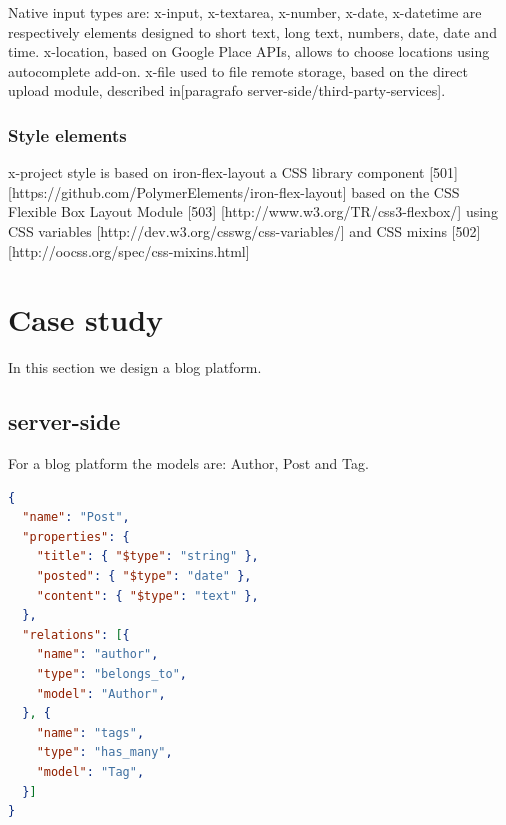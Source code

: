 \documentclass{sig-alternate}
\begin{document}
Native input types are: x-input, x-textarea, x-number, x-date, x-datetime are respectively elements designed to short text, long text, numbers, date, date and time. x-location, based on Google Place APIs, allows to choose locations using autocomplete add-on. x-file used to file remote storage, based on the direct upload module, described in[paragrafo server-side/third-party-services].







\subsubsection{Style elements}
x-project style is based on iron-flex-layout a CSS library component  [501][https://github.com/PolymerElements/iron-flex-layout]
 based on the CSS Flexible Box Layout Module [503] [http://www.w3.org/TR/css3-flexbox/] using CSS variables [http://dev.w3.org/csswg/css-variables/] and CSS mixins [502][http://oocss.org/spec/css-mixins.html] 





\section{Case study}
In this section we design a blog platform. 


\subsection{server-side}
For a blog platform the models are: Author, Post and Tag.


\begin{lstlisting}[language=json, label={lst:add-a-label-here-n3}, captionpos=b, caption=Post model.]
{
  "name": "Post",
  "properties": {
    "title": { "$type": "string" },
    "posted": { "$type": "date" },
    "content": { "$type": "text" },
  }, 
  "relations": [{ 
    "name": "author", 
    "type": "belongs_to",
    "model": "Author",
  }, {
    "name": "tags", 
    "type": "has_many",
    "model": "Tag",
  }]
}
\end{lstlisting}
\end{document}
